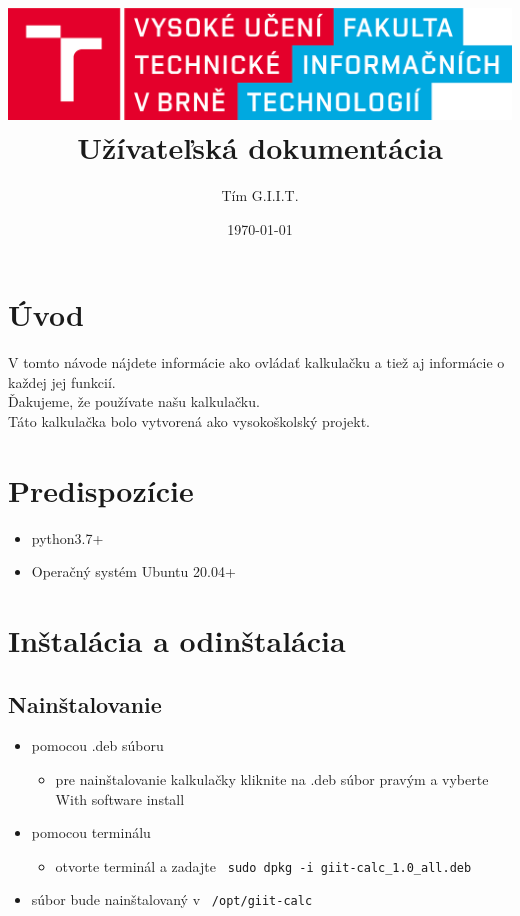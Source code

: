 \documentclass[a4paper, 11pt]{article}
\title{\includegraphics[scale=0.1,keepaspectratio]{src/latex/pics/logo_cz.eps}\\Užívateľská dokumentácia}
\author{Tím G.I.I.T.}
\date{\today}
\begin{document}
	\maketitle
	\newpage
	
    \section{Úvod}
    V tomto návode nájdete informácie ako ovládať kalkulačku a tiež aj informácie o každej jej funkcií.\\
    Ďakujeme, že používate našu kalkulačku. \\
    Táto kalkulačka bolo vytvorená ako vysokoškolský projekt. 
    \section{Predispozície}
    \begin{itemize}
        \item python3.7+
        \item Operačný systém Ubuntu 20.04+
    \end{itemize}
    \section{Inštalácia a odinštalácia}
    \subsection{Nainštalovanie}
    \begin{itemize}
        \item pomocou .deb súboru
        \begin{itemize}
            \item pre nainštalovanie kalkulačky kliknite na .deb súbor pravým a vyberte With software install
        \end{itemize}
        \item pomocou terminálu
        \begin{itemize}
            \item otvorte terminál a zadajte \texttt{ sudo dpkg -i giit-calc\_1.0\_all.deb }
        \end{itemize}
        \item súbor bude nainštalovaný v \texttt{ /opt/giit-calc }
    \end{itemize}
\end{document}
